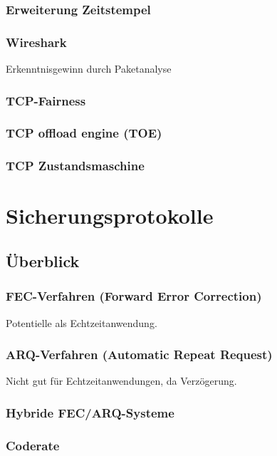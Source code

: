 \subsection{Erweiterung Zeitstempel}
\subsection{Wireshark}
Erkenntnisgewinn durch Paketanalyse
\subsection{TCP-Fairness}
\subsection{TCP offload engine (TOE)}
\subsection{TCP Zustandsmaschine}

\chapter{Sicherungsprotokolle}
\section{Überblick}
\subsection{FEC-Verfahren (Forward Error Correction)}
Potentielle als Echtzeitanwendung.

\subsection{ARQ-Verfahren (Automatic Repeat Request)}
Nicht gut für Echtzeitanwendungen, da Verzögerung.

\subsection{Hybride FEC/ARQ-Systeme}

\subsection{Coderate}

